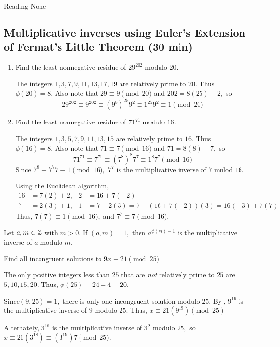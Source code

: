 \documentclass[letterpaper, 11 pt]{ximera}
\begin{document}
\begin{pre}
    \item[Reading] None
\end{pre}

\subsection{Multiplicative inverses using Euler's Extension of Fermat's Little Theorem (30 min)}

\begin{example}\label{ex-euler-solve-cong}
 
\begin{enumerate}
 \item Find the least nonnegative residue of $29^{202}$ modulo $20$. 
 
 The integers $1,3,7,9,11,13,17,19$ are relatively prime to $20.$ Thus $\phi(20)=8.$ Also note that $29\equiv 9\pmod{20}$ and $202=8(25)+2,$ so 
 \[29^{202}\equiv 9^{202}\equiv(9^8)^{25} 9^2\equiv 1^{25} 9^2\equiv 1\pmod{20}\] 
 
 \item Find the least nonnegative residue of $71^{71}$ modulo $16$.
 
 The integers $1,3,5,7,9,11,13,15$ are relatively prime to $16.$ Thus $\phi(16)=8.$ Also note that $71\equiv 7\pmod{16}$ and $71=8(8)+7,$ so 
  \[71^{71}\equiv 7^{71}\equiv(7^8)^{8} 7^7\equiv 1^{8} 7^7\pmod{16}\] 
Since $7^8\equiv 7^7 7\equiv 1\pmod{16},$ $7^7$ is the multiplicative inverse of $7$ mulod $16.$

Using the Euclidean algorithm, 
\begin{align*}
 16	& = 7(2) + 2,	&2&=16+7(-2)\\
 7	& = 2(3) + 1,	&1&=7-2(3)=7-(16+7(-2))(3)=16(-3)+7(7)
\end{align*}
Thus, $7(7)\equiv 1\pmod{16},$ and $7^7\equiv 7\pmod{16}.$
\end{enumerate}
\end{example}

\begin{cor*}[Corollary 2.19]\label{cor:inv-euler}
 Let $a,m\in\mathbb Z$ with $m>0.$  If $(a,m)=1,$ then $a^{\phi(m)-1}$ is the multiplicative inverse of $a$ modulo $m$.
\end{cor*}

\begin{example}
 Find all incongruent solutions to $9x\equiv 21\pmod{25}$.
 
The only positive integers less than $25$ that are \emph{not} relatively prime to $25$ are $5,10,15,20$. Thus, $\phi(25)=24-4=20.$

Since$(9,25)=1,$ there is only one  incongruent solution  modulo $25.$ By , $9^{19}$ is the multiplicative inverse of $9$ modulo ${25}$. Thus, $x\equiv 21(9^{19})\pmod{25.}$

Alternately, $3^{18}$ is the multiplicative inverse of $3^2$ modulo ${25},$ so $x\equiv 21(3^{18})\equiv  (3^{19})7\pmod{25}.$
\end{example}
\end{document}
